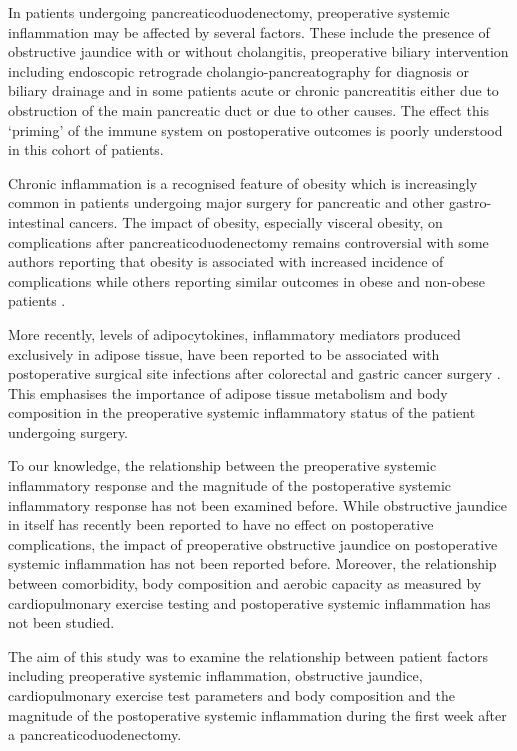 In patients undergoing pancreaticoduodenectomy, preoperative systemic inflammation may be affected by several factors. 
These include the presence of obstructive jaundice with or without cholangitis, preoperative biliary intervention including endoscopic retrograde cholangio-pancreatography for diagnosis or biliary drainage and in some patients acute or chronic pancreatitis either due to obstruction of the main pancreatic duct or due to other causes. 
The effect this `priming' of the immune system on postoperative outcomes is poorly understood in this cohort of patients. 

Chronic inflammation is a recognised feature of obesity which is increasingly common in patients undergoing major surgery for pancreatic and other gastro-intestinal cancers. 
The impact of obesity, especially visceral obesity, on complications after pancreaticoduodenectomy remains controversial with some authors reporting that obesity is associated with increased incidence of complications \parencite{house_preoperative_2008, ramsey_body_2011} while others reporting similar outcomes in obese and non-obese patients \parencite{khan_does_2010, tsai_impact_2010, balentine_obesity_2011}. 

More recently, levels of adipocytokines, inflammatory mediators produced exclusively in adipose tissue, have been reported to be associated with postoperative surgical site infections after colorectal \parencite{ortega-deballon_preoperative_2013, matsuda_preoperative_2009} and gastric cancer surgery \parencite{yamamoto_association_2013}.
This emphasises the importance of adipose tissue metabolism and body composition in the preoperative systemic inflammatory status of the patient undergoing surgery. 

To our knowledge, the relationship between the preoperative systemic inflammatory response and the magnitude of the postoperative systemic inflammatory response has not been examined before. 
While obstructive jaundice in itself has recently been reported to have no effect on postoperative complications, the impact of preoperative obstructive jaundice on postoperative systemic inflammation has not been reported before. 
Moreover, the relationship between comorbidity, body composition and aerobic capacity as measured by cardiopulmonary exercise testing and postoperative systemic inflammation has not been studied. 

The aim of this study was to examine the relationship between patient factors including preoperative systemic inflammation, obstructive jaundice, cardiopulmonary exercise test parameters and body composition and the magnitude of the postoperative systemic inflammation during the first week after a pancreaticoduodenectomy. 

